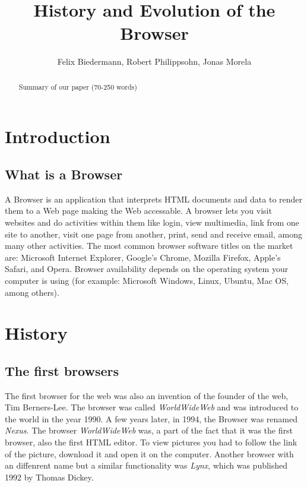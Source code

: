 \documentclass[runningheads]{llncs}
\title{History and Evolution of the Browser}
\author{Felix Biedermann, Robert Philippsohn, Jonas Morela}
\institute{University of Stuttgart, Institute for Architecture of Application Systems \\
Universitätsstraße 38, 70569 Stuttgart, Germany}
\begin{document}
\maketitle

	\begin{abstract}
		Summary of our paper (70-250 words)
	\end{abstract}

\clearpage
	\section{Introduction}
		\subsection{What is a Browser}
		A Browser is an application that interprets HTML documents and data to render them to a Web page making the Web accessable. A browser lets you visit websites and do activities within them like login, view multimedia, link from one site to another, visit one page from another, print, send and receive email, among many other activities. The most common browser software titles on the market are: Microsoft Internet Explorer, Google's Chrome, Mozilla Firefox, Apple's Safari, and Opera. Browser availability depends on the operating system your computer is using (for example: Microsoft Windows, Linux, Ubuntu, Mac OS, among others).
		
	\section{History}
		\subsection{The first browsers}
		The first browser for the web was also an invention of the founder of the web, Tim Berners-Lee. The browser was called \textit{WorldWideWeb} and was introduced to the world in the year 1990. A few years later, in 1994, the Browser was renamed \textit{Nexus}. The browser \textit{WorldWideWeb} was, a part of the fact that it was the first browser, also the first HTML editor.
		To view pictures you had to follow the link of the picture, download it and open it on the computer. Another browser with an diffenrent name but a similar functionality was \textit{Lynx}, which was published 1992 by Thomas Dickey.
\end{document}
